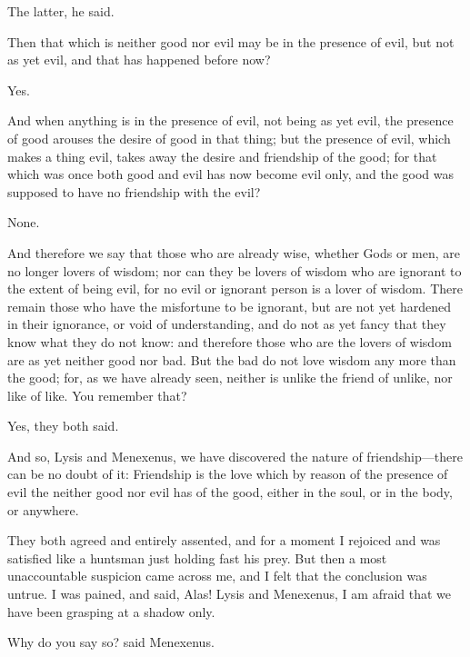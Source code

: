 \documentclass[11pt,letter]{article}
\begin{document}
\par  The latter, he said.

\par  Then that which is neither good nor evil may be in the presence of evil, but not as yet evil, and that has happened before now?

\par  Yes.

\par  And when anything is in the presence of evil, not being as yet evil, the presence of good arouses the desire of good in that thing; but the presence of evil, which makes a thing evil, takes away the desire and friendship of the good; for that which was once both good and evil has now become evil only, and the good was supposed to have no friendship with the evil?

\par  None.

\par  And therefore we say that those who are already wise, whether Gods or men, are no longer lovers of wisdom; nor can they be lovers of wisdom who are ignorant to the extent of being evil, for no evil or ignorant person is a lover of wisdom. There remain those who have the misfortune to be ignorant, but are not yet hardened in their ignorance, or void of understanding, and do not as yet fancy that they know what they do not know: and therefore those who are the lovers of wisdom are as yet neither good nor bad. But the bad do not love wisdom any more than the good; for, as we have already seen, neither is unlike the friend of unlike, nor like of like. You remember that?

\par  Yes, they both said.

\par  And so, Lysis and Menexenus, we have discovered the nature of friendship—there can be no doubt of it: Friendship is the love which by reason of the presence of evil the neither good nor evil has of the good, either in the soul, or in the body, or anywhere.

\par  They both agreed and entirely assented, and for a moment I rejoiced and was satisfied like a huntsman just holding fast his prey. But then a most unaccountable suspicion came across me, and I felt that the conclusion was untrue. I was pained, and said, Alas! Lysis and Menexenus, I am afraid that we have been grasping at a shadow only.

\par  Why do you say so? said Menexenus.
\end{document}
